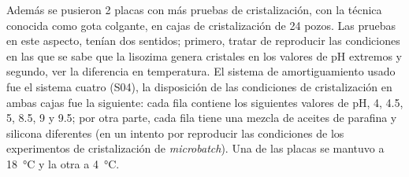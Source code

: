 \documentclass[11pt,letterpaper]{article}
\begin{document}
\begin{table}[h]
\centering
{}
\caption{Pruebas de cristalización de PF17-8. Gotas de \SI{4}{\micro\liter}.}
\label{tab:crispf178}
\end{table}

Además se pusieron 2 placas con más pruebas de cristalización, con la técnica conocida como gota colgante, en cajas de cristalización de 24 pozos. Las pruebas en este aspecto, tenían dos sentidos; primero, tratar de reproducir las condiciones en las que se sabe que la lisozima genera cristales en los valores de pH extremos y segundo, ver la diferencia en temperatura. El sistema de amortiguamiento usado fue el sistema cuatro (S04), la disposición de las condiciones de cristalización en ambas cajas fue la siguiente: cada fila contiene los siguientes valores de pH, \num{4}, \num{4.5}, \num{5}, \num{8.5}, \num{9} y \num{9.5}; por otra parte, cada fila tiene una mezcla de aceites de parafina y silicona diferentes (en un intento por reproducir las condiciones de los experimentos de cristalización de \emph{microbatch}). Una de las placas se mantuvo a \SI{18}{\degreeCelsius} y la otra a \SI{4}{\degreeCelsius}. 
\end{document}
